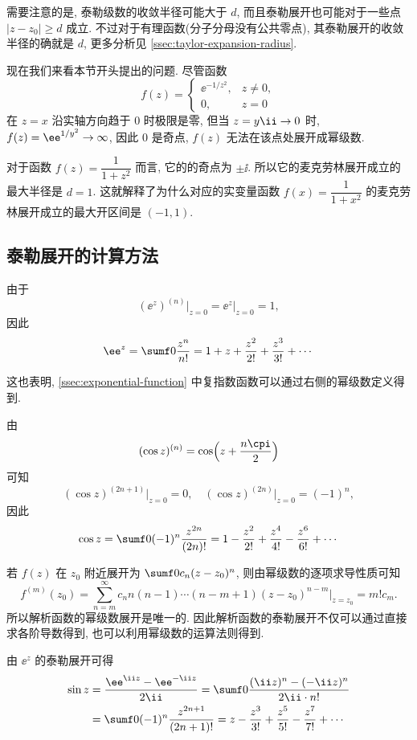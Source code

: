 需要注意的是, 泰勒级数的收敛半径可能大于 $d$, 而且泰勒展开也可能对于一些点 $|z-z_0|\ge d$ 成立.
不过对于有理函数(分子分母没有公共零点), 其泰勒展开的收敛半径的确就是 $d$, 更多分析见 \ref{ssec:taylor-expansion-radius}.

现在我们来看本节开头提出的问题. 尽管函数
\[
  f(z)=\begin{cases}
    \ee^{-1/z^2},&z\neq 0,\\
    0,&z=0
  \end{cases}
\]
在 $z=x$ 沿实轴方向趋于 $0$ 时极限是零, 但当 $z=y\ii\ra0$ 时, $f(z)=\ee^{1/y^2}\ra\infty$, 因此 $0$ 是奇点, $f(z)$ 无法在该点处展开成幂级数.

对于函数 $f(z)=\dfrac1{1+z^2}$ 而言, 它的的奇点为 $\pm\ii$.
所以它的麦克劳林展开成立的最大半径是 $d=1$.
这就解释了为什么对应的实变量函数 $f(x)=\dfrac1{1+x^2}$ 的麦克劳林展开成立的最大开区间是 $(-1,1)$.


\subsection{泰勒展开的计算方法}

\begin{example}
  \label{exam:exp-taylor-expansion}
  由于
  \[
    (\ee^z)^{(n)}\big|_{z=0}=\ee^z\big|_{z=0}=1,
  \]
  因此
  \[
     \ee^z=\sumf0 \frac{z^n}{n!}
    =1+z+\frac{z^2}{2!}+\frac{z^3}{3!}+\cdots
  \]
\end{example}

这也表明, \ref{ssec:exponential-function} 中复指数函数可以通过右侧的幂级数定义得到.

\begin{example}
  由
  \[
    (\cos z)^{(n)}=\cos\Bigl(z+\frac{n\cpi}2\Bigr)
  \]
  可知
  \[
    (\cos z)^{(2n+1)}\big|_{z=0}=0,\quad 
    (\cos z)^{(2n)}\big|_{z=0}=(-1)^n,
  \]
  因此
  \[
     \cos z
    =\sumf0 (-1)^n\frac{z^{2n}}{(2n)!}
    =1-\frac{z^2}{2!}+\frac{z^4}{4!}-\frac{z^6}{6!}+\cdots
  \]
\end{example}

若 $f(z)$ 在 $z_0$ 附近展开为 $\sumf0 c_n(z-z_0)^n$,
则由幂级数的逐项求导性质可知
\[
   f^{(m)}(z_0)
  =\sum_{n=m}^\infty c_n n(n-1)\cdots(n-m+1)(z-z_0)^{n-m}
    \Big|_{z=z_0}
  =m!c_m.
\]
所以\alert{解析函数的幂级数展开是唯一的}.
因此解析函数的泰勒展开不仅可以通过直接求各阶导数得到, 也可以\alert{利用幂级数的运算法则得到}.

\begin{example}
  由 $\ee^z$ 的泰勒展开可得
  \begin{align*}
     \sin z&
    =\frac{\ee^{\ii z}-\ee^{-\ii z}}{2\ii}
    =\sumf0 \frac{(\ii z)^n-(-\ii z)^n}{2\ii\cdot n!}\\&
    =\sumf0 (-1)^n\frac{z^{2n+1}}{(2n+1)!}
    =z-\frac{z^3}{3!}+\frac{z^5}{5!}-\frac{z^7}{7!}+\cdots
  \end{align*}
\end{example}


